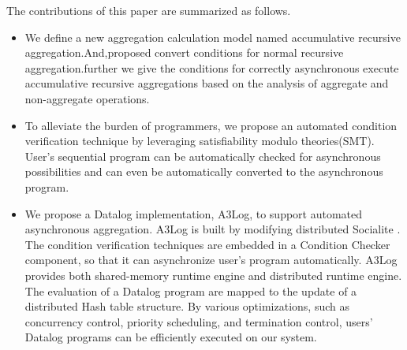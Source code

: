 The contributions of this paper are summarized as follows.
\begin{itemize}
	\item We define a new aggregation calculation model named accumulative recursive aggregation.And,proposed convert conditions for normal recursive aggregation.further we give the conditions for correctly asynchronous execute accumulative recursive aggregations based on the analysis of aggregate and non-aggregate operations.  
	\item To alleviate the burden of programmers, we propose an automated condition verification technique by leveraging satisfiability modulo theories(SMT). User's sequential program can be automatically checked for asynchronous possibilities and can even be automatically converted to the asynchronous program.
	\item We propose a Datalog implementation, A3Log, to support automated asynchronous aggregation. A3Log is built by modifying distributed Socialite \cite{Seo:2013:DSD:2556549.2556572}. The condition verification techniques are embedded in a Condition Checker component, so that it can asynchronize user's program automatically.	 A3Log provides both shared-memory runtime engine and distributed runtime engine. The evaluation of a Datalog program are mapped to the update of a distributed Hash table structure. By various optimizations, such as concurrency control, priority scheduling, and termination control, users' Datalog programs can be efficiently executed on our system.

\end{itemize}
